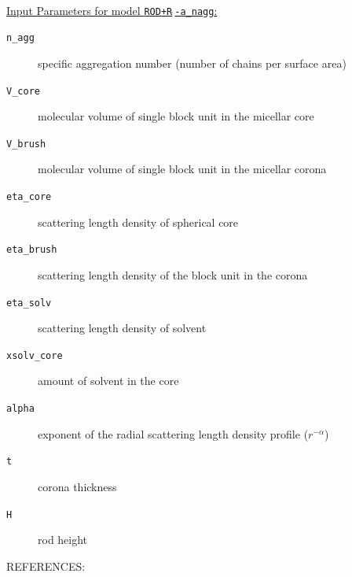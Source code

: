 \hspace{1pt}\\
\uline{Input Parameters for model \texttt{ROD+R$\hat{~}$-a\_nagg}:}
\begin{description}
\item[\texttt{n\_agg}] specific aggregation number (number of chains per surface area)
\item[\texttt{V\_core}] molecular volume of single block unit in the micellar core
\item[\texttt{V\_brush}]  molecular volume of single block unit in the micellar corona
\item[\texttt{eta\_core}] scattering length density of spherical core
\item[\texttt{eta\_brush}] scattering length density of the block unit in the corona
\item[\texttt{eta\_solv}] scattering length density of solvent
\item[\texttt{xsolv\_core}] amount of solvent in the core
\item[\texttt{alpha}] exponent of the radial scattering length density profile ($r^{-\alpha}$)
\item[\texttt{t}] corona thickness
\item[\texttt{H}] rod height
\end{description}

\noindent
REFERENCES:\\
\cite{DaoudCotton82,FoersterHermsdorf2002,MuellerDelsanti2000,Wijmans93}


\clearpage

